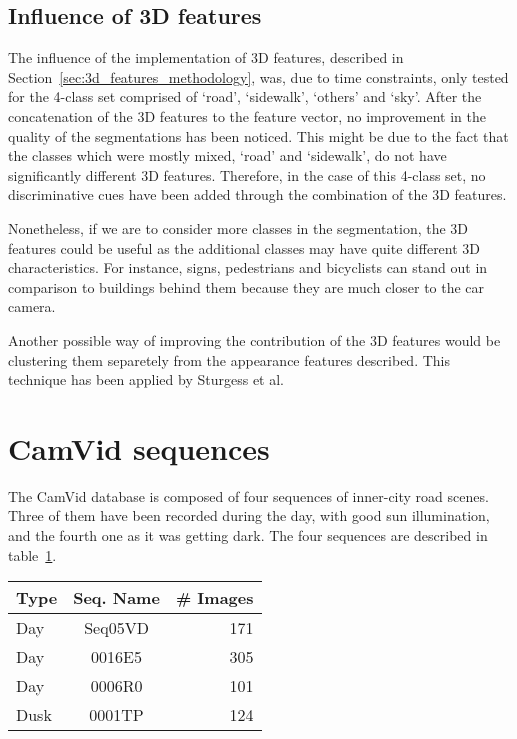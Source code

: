\subsection{Influence of 3D features}
The influence of the implementation of 3D features, described in Section~\ref{sec:3d_features_methodology}, was, due to time constraints, only tested for the 4-class set comprised of `road', `sidewalk', `others' and `sky'. After the concatenation of the 3D features to the feature vector, no improvement in the quality of the segmentations has been noticed. This might be due to the fact that the classes which were mostly mixed, `road' and `sidewalk', do not have significantly different 3D features. Therefore, in the case of this 4-class set, no discriminative cues have been added through the combination of the 3D features.

Nonetheless, if we are to consider more classes in the segmentation, the 3D features could be useful as the additional classes may have quite different 3D characteristics. For instance, signs, pedestrians and bicyclists can stand out in comparison to buildings behind them because they are much closer to the car camera.

Another possible way of improving the contribution of the 3D features would be clustering them separetely from the appearance features described. This technique has been applied by Sturgess et al.

\section{CamVid sequences}

The CamVid database is composed of four sequences of inner-city road scenes. Three of them have been recorded during the day, with good sun illumination, and the fourth one as it was getting dark. The four sequences are described in table~\ref{table:camvid_sequences}.

\begin{table}
 \centering
\begin{tabular}{ | l | c | r | }
\hline			
  Type & Seq. Name & \# Images\\
  \hline	
  \hline	
  Day & Seq05VD & 171 \\
  \hline	
  Day & 0016E5 & 305 \\
  \hline	
  Day & 0006R0 & 101 \\
  \hline	
  Dusk & 0001TP & 124\\
\hline
\end{tabular}
\label{table:camvid_sequences}
\end{table}

